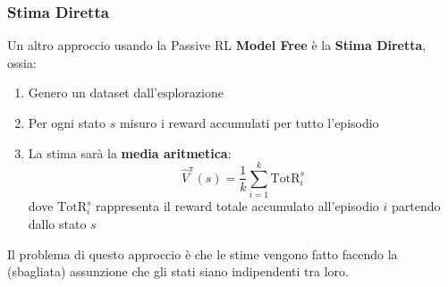 \subsubsection{Stima Diretta}
Un altro approccio usando la Passive RL \textbf{Model Free} è la \textbf{Stima Diretta}, ossia:
\begin{enumerate}
    \item Genero un dataset dall'esplorazione
    \item Per ogni stato $s$ misuro i reward accumulati per tutto l'episodio
    \item La stima sarà la \textbf{media aritmetica}:
    \begin{equation}
        \widehat{V}^\pi(s) = \frac{1}{k}\sum_{i = 1}^{k} \text{TotR}^s_i
    \end{equation}
    dove $\text{TotR}^s_i$ rappresenta il reward totale accumulato all'episodio $i$ partendo dallo stato $s$
\end{enumerate}
Il problema di questo approccio è che le stime vengono fatto facendo la (sbagliata) assunzione che gli stati siano indipendenti tra loro.